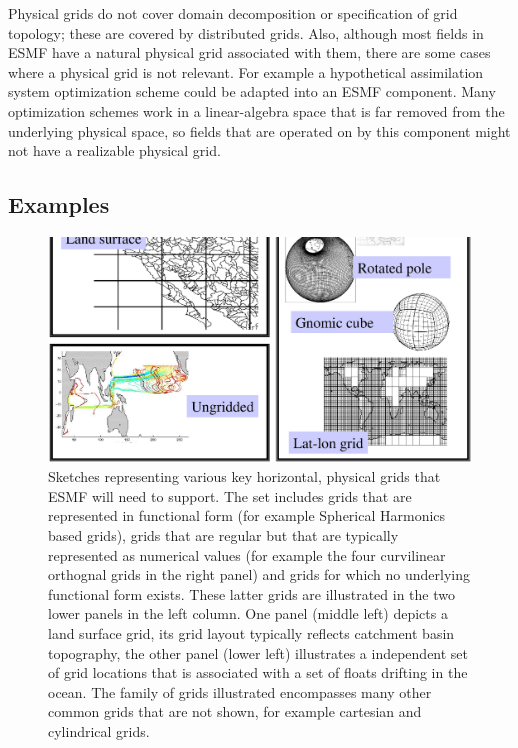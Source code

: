 Physical grids do not cover domain decomposition or specification of grid
topology; these are covered by distributed grids. Also, although most fields
in ESMF have a natural physical grid associated with them, there are
some cases where a physical grid is not relevant. For example
a hypothetical assimilation system optimization scheme could be adapted
into an ESMF component. Many optimization schemes work in a linear-algebra
space that is far removed from the underlying physical space, so fields
that are operated on by this component might not have a realizable
physical grid.

\subsection{Examples}


\begin{figure}
\includegraphics[trim= 100 200 100 -100,width= 5.5in]{hgridmontage.eps}
\caption{
Sketches representing various key horizontal, physical grids that ESMF will
need to support. The set includes grids that are represented
in functional form (for example Spherical Harmonics based
grids), grids that are regular but that are typically 
represented as numerical values (for example the four
curvilinear orthognal grids in the right panel) and grids for
which no underlying functional form exists. These latter
grids are illustrated in the two lower panels in the left column.
One panel (middle left) depicts a land surface grid, its
grid layout typically reflects catchment basin topography,
the other panel (lower left) illustrates a independent
set of grid locations that is associated with a set of 
floats drifting in the ocean. The family of grids illustrated
encompasses many other common grids that are not shown, for example
cartesian and cylindrical grids.
\label{fig:pg_reqdoc:hgridmontage}
}
\end{figure}

